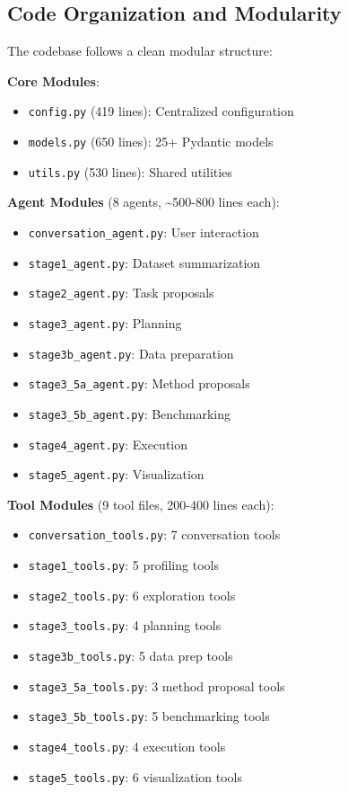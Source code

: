\documentclass[11pt,a4paper]{article}
\begin{document}
\subsection{Code Organization and Modularity}

The codebase follows a clean modular structure:

\textbf{Core Modules}:
\begin{itemize}
    \item \texttt{config.py} (419 lines): Centralized configuration
    \item \texttt{models.py} (650 lines): 25+ Pydantic models
    \item \texttt{utils.py} (530 lines): Shared utilities
\end{itemize}

\textbf{Agent Modules} (8 agents, \~{}500-800 lines each):
\begin{itemize}
    \item \texttt{conversation\_agent.py}: User interaction
    \item \texttt{stage1\_agent.py}: Dataset summarization
    \item \texttt{stage2\_agent.py}: Task proposals
    \item \texttt{stage3\_agent.py}: Planning
    \item \texttt{stage3b\_agent.py}: Data preparation
    \item \texttt{stage3\_5a\_agent.py}: Method proposals
    \item \texttt{stage3\_5b\_agent.py}: Benchmarking
    \item \texttt{stage4\_agent.py}: Execution
    \item \texttt{stage5\_agent.py}: Visualization
\end{itemize}

\textbf{Tool Modules} (9 tool files, 200-400 lines each):
\begin{itemize}
    \item \texttt{conversation\_tools.py}: 7 conversation tools
    \item \texttt{stage1\_tools.py}: 5 profiling tools
    \item \texttt{stage2\_tools.py}: 6 exploration tools
    \item \texttt{stage3\_tools.py}: 4 planning tools
    \item \texttt{stage3b\_tools.py}: 5 data prep tools
    \item \texttt{stage3\_5a\_tools.py}: 3 method proposal tools
    \item \texttt{stage3\_5b\_tools.py}: 5 benchmarking tools
    \item \texttt{stage4\_tools.py}: 4 execution tools
    \item \texttt{stage5\_tools.py}: 6 visualization tools
\end{itemize}
\end{document}
